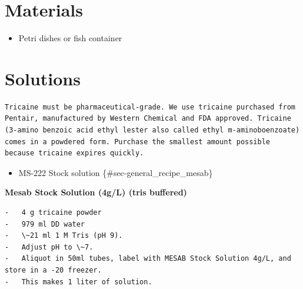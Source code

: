 \documentclass[
  letterpaper,
  DIV=11,
  numbers=noendperiod]{scrreprt}
\providecommand{\tightlist}{%
  \setlength{\itemsep}{0pt}\setlength{\parskip}{0pt}}\usepackage{longtable,booktabs,array}
\begin{document}
\hypertarget{materials-59}{%
\section{Materials}\label{materials-59}}

\begin{itemize}
\tightlist
\item
  Petri dishes or fish container
\end{itemize}

\hypertarget{solutions-49}{%
\section{Solutions}\label{solutions-49}}

\begin{tcolorbox}[enhanced jigsaw, rightrule=.15mm, title=\textcolor{quarto-callout-warning-color}{\faExclamationTriangle}\hspace{0.5em}{NOTES}, titlerule=0mm, opacitybacktitle=0.6, toprule=.15mm, bottomrule=.15mm, opacityback=0, left=2mm, colframe=quarto-callout-warning-color-frame, breakable, coltitle=black, colback=white, colbacktitle=quarto-callout-warning-color!10!white, bottomtitle=1mm, leftrule=.75mm, toptitle=1mm, arc=.35mm]

\begin{verbatim}
Tricaine must be pharmaceutical-grade. We use tricaine purchased from Pentair, manufactured by Western Chemical and FDA approved. Tricaine (3-amino benzoic acid ethyl lester also called ethyl m-aminoboenzoate) comes in a powdered form. Purchase the smallest amount possible because tricaine expires quickly.
\end{verbatim}

\end{tcolorbox}

\begin{itemize}
\tightlist
\item
  MS-222 Stock solution \{\#sec-general\_recipe\_mesab\}
\end{itemize}

\textbf{Mesab Stock Solution (4g/L) (tris buffered)}

\begin{verbatim}
-   4 g tricaine powder
-   979 ml DD water
-   \~21 ml 1 M Tris (pH 9).
-   Adjust pH to \~7.
-   Aliquot in 50ml tubes, label with MESAB Stock Solution 4g/L, and store in a -20 freezer.
-   This makes 1 liter of solution.
\end{verbatim}
\end{document}
